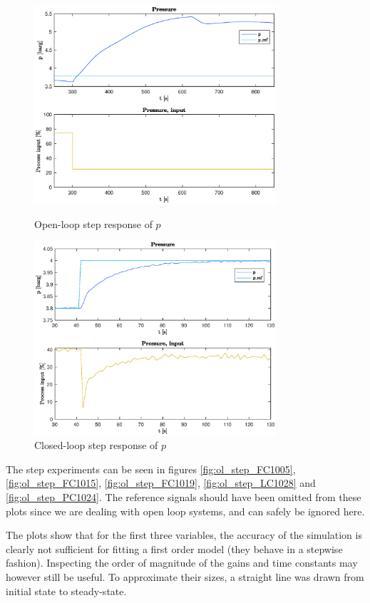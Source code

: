 \documentclass[12pt]{article}
\begin{document}
\begin{figure}[p]
\centering
\includegraphics[width=0.8\textwidth]{../Systemanalyse/Log_Data_to_Matlab/Figurer/Stegeksperimenter/PC1024.eps}
\caption{Open-loop step response of $p$}
\label{fig:ol_step_PC1024}

\includegraphics[width=0.8\textwidth]{../Systemanalyse/Log_Data_to_Matlab/Figurer/Stegeksperimenter/PC1024_step.eps}
\caption{Closed-loop step response of $p$}
\label{fig:cl_step_PC1024}
\end{figure}

The step experiments can be seen in figures \ref{fig:ol_step_FC1005}, \ref{fig:ol_step_FC1015}, \ref{fig:ol_step_FC1019}, \ref{fig:ol_step_LC1028} and \ref{fig:ol_step_PC1024}. The reference signals should have been omitted from these plots since we are dealing with open loop systems, and can safely be ignored here.

The plots show that for the first three variables, the accuracy of the simulation is clearly not sufficient for fitting a first order model (they behave in a stepwise fashion). Inspecting the order of magnitude of the gains and time constants may however still be useful. To approximate their sizes, a straight line was drawn from initial state to steady-state.
\end{document}
